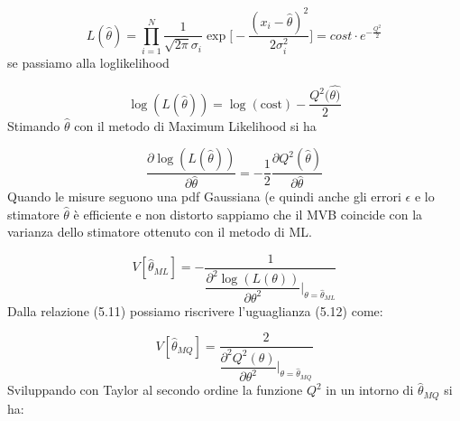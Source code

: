 \begin{equation*}
	L(\hat{\theta}) = \prod_{i=1}^N \dfrac{1}{\sqrt{2\pi}\sigma_i}\exp{\Big [-\frac{ (x_i-\hat{\theta})^2}{2 \sigma_i^2} \Big]} = cost \cdot e^{-\frac{Q^2}{2}}
\end{equation*}
se passiamo alla loglikelihood

\begin{equation*}
	\log(L(\hat{\theta})) = \log(\text{cost}) - \dfrac{Q^2(\hat{\theta)}}{2}
\end{equation*}
Stimando $\hat{\theta}$ con il metodo di Maximum Likelihood si ha

\begin{equation}
	\dfrac{\partial \log(L(\hat{\theta}))}{\partial \hat{\theta}} = - \dfrac{1}{2}\dfrac{\partial Q^2(\hat{\theta})}{\partial \hat{\theta}}
\end{equation}
Quando le misure seguono una pdf Gaussiana (e quindi anche gli errori $\epsilon$ e lo stimatore $\hat{\theta}$ \`{e} efficiente e non distorto sappiamo che il MVB coincide con la varianza dello stimatore ottenuto con il metodo di ML.

\begin{equation}
	V[\hat{\theta}_{ML}] = - \dfrac{1}{\dfrac{\partial^2 \log(L(\theta))}{\partial \theta^2} \Big \vert_{\theta = \hat{\theta}_{ML}}} 
\end{equation}
Dalla relazione (5.11) possiamo riscrivere l'uguaglianza (5.12) come:

\begin{equation}
	V[\hat{\theta}_{MQ}] = \dfrac{2}{\dfrac{\partial^2Q^2(\theta)}{\partial \theta^2} \Big \vert_{\theta = \hat{\theta}_{MQ}}}
\end{equation}
Sviluppando con Taylor al secondo ordine la funzione $Q^2$ in un intorno di $\hat{\theta}_{MQ}$ si ha:

